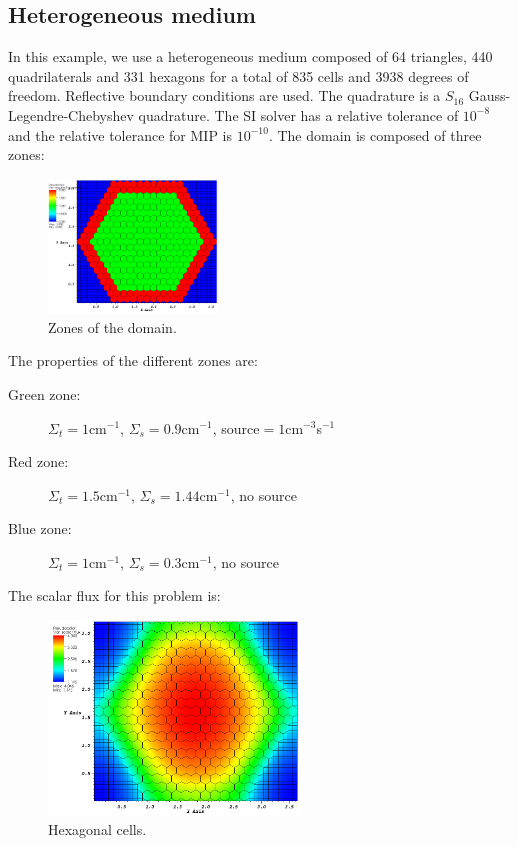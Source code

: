 \subsection{Heterogeneous medium}
In this example, we use a heterogeneous medium composed of 64 triangles, 440
quadrilaterals and 331 hexagons for a total of 835 cells and 3938 degrees of
freedom. Reflective boundary conditions are used. The quadrature is a $S_{16}$
Gauss-Legendre-Chebyshev quadrature. The SI solver has a relative tolerance of 
$10^{-8}$ and the relative tolerance for MIP is $10^{-10}$. The domain is
composed of three zones:
\begin{figure}[H]
\centering
\includegraphics[width=0.4\textwidth]{source_crop}
\caption{Zones of the domain.}
\end{figure}
The properties of the different zones are:
\begin{description}
\item[Green zone:] $\Sigma_t =1$cm$^{-1}$, $\Sigma_s = 0.9$cm$^{-1}$, source$ =
1$cm$^{-3}$s$^{-1}$
\item[Red zone:] $\Sigma_t = 1.5$cm$^{-1}$, $\Sigma_s = 1.44$cm$^{-1}$, no source
\item[Blue zone:] $\Sigma_t = 1$cm$^{-1}$, $\Sigma_s = 0.3$cm$^{-1}$, no source
\end{description}
The scalar flux for this problem is:
\begin{figure}[H]
\centering
\includegraphics[width=0.6\textwidth]{heter_hexag_crop}
\caption{Hexagonal cells.}
\end{figure}
